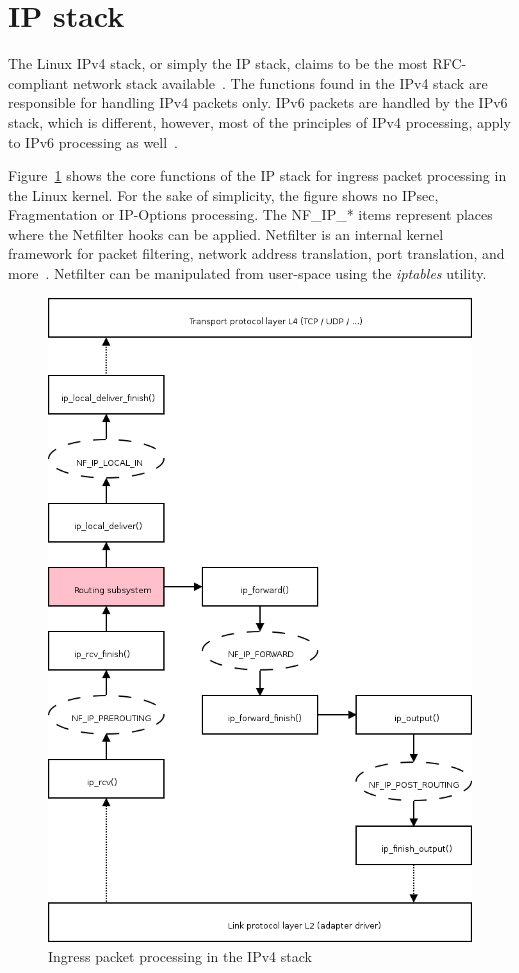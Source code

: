 
\section{IP stack}\label{sec:linux-ip}
The Linux IPv4 stack, or simply the IP stack, claims to be the most RFC-compliant network stack available~\cite{linux-foundation-toe}.
The functions found in the IPv4 stack are responsible for handling IPv4 packets only.
IPv6 packets are handled by the IPv6 stack, which is different,
however, most of the principles of IPv4 processing, apply to IPv6 processing as well~\cite{linux-kernel-networking}.

Figure~\ref{fig:linux-ingress-packet} shows the core functions of the IP stack for ingress packet processing in the Linux kernel.
For the sake of simplicity, the figure shows no IPsec, Fragmentation or IP-Options processing.
The NF\_IP\_* items represent places where the Netfilter hooks can be applied.
Netfilter is an internal kernel framework for packet filtering,
network address translation, port translation, and more~\cite{netfilter}.
Netfilter can be manipulated from user-space using the {\it{iptables}} utility.

\begin{figure}
	\centering
	\includegraphics[width=12cm,keepaspectratio]{fig/kernel-layer3-flow.png}
	\caption{Ingress packet processing in the IPv4 stack}
	\label{fig:linux-ingress-packet}
	\bigskip
\end{figure}

